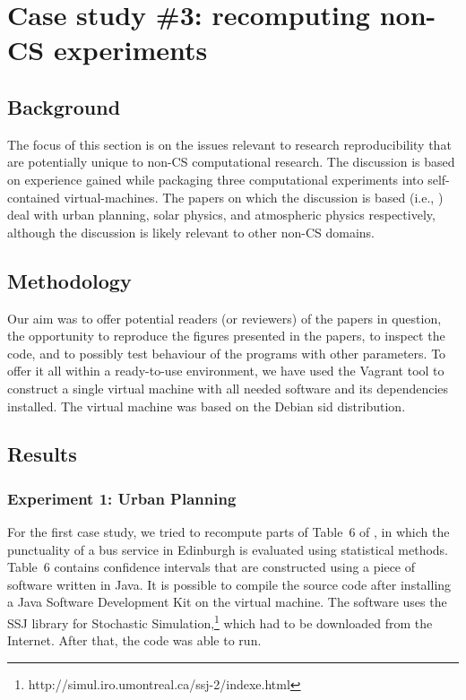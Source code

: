 \section{Case study \#3: recomputing non-CS experiments}
\label{s:group3}

\subsection{Background}

The focus of this section is on the issues relevant to research reproducibility that are potentially 
  unique to non-CS computational research.
The discussion is based on experience gained while packaging three computational experiments 
  into self-contained virtual-machines.
The papers on which the discussion is based (i.e., \cite{danielpaper,bareford2010nanoflare,arabas2013libcloud}) 
  deal with urban planning, solar physics, and atmospheric physics respectively, 
  although the discussion is likely relevant to other non-CS domains.

\subsection{Methodology}

Our aim was to offer potential readers (or reviewers) of the papers in question, 
  the opportunity to reproduce the figures presented in the papers, 
  to inspect the code, and to possibly test behaviour of the programs with other parameters.
To offer it all within a ready-to-use environment, we have used the Vagrant tool to
  construct a single virtual machine with all needed software and its dependencies installed.
The virtual machine was based on the Debian sid distribution.

\subsection{Results}
\subsubsection*{Experiment 1: Urban Planning}

For the first case study, we tried to recompute parts of Table~6 of \cite{danielpaper}, in which the punctuality of a bus service in Edinburgh is evaluated using statistical methods. Table~6 contains confidence intervals that are constructed using a piece of software written in Java. It is possible to compile the source code after installing a Java Software Development Kit on the virtual machine. The software uses the SSJ library for Stochastic Simulation,\footnote{http://simul.iro.umontreal.ca/ssj-2/indexe.html} which had to be downloaded from the Internet. After that, the code was able to run.

